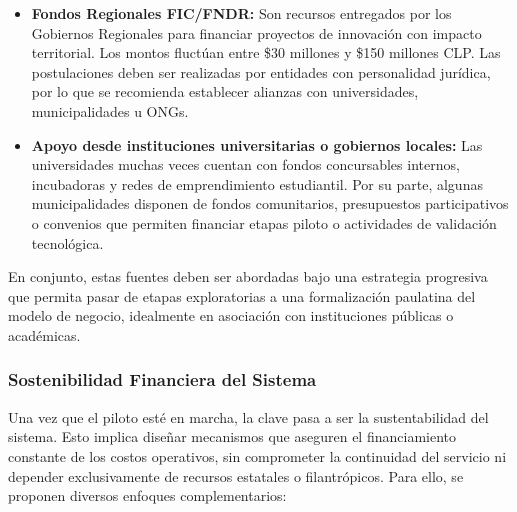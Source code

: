 \documentclass[12pt]{article}
\begin{document}
\begin{itemize}
    \item \textbf{Fondos Regionales FIC/FNDR:} Son recursos entregados por los Gobiernos Regionales para financiar proyectos de innovación con impacto territorial. Los montos fluctúan entre \$30 millones y \$150 millones CLP. Las postulaciones deben ser realizadas por entidades con personalidad jurídica, por lo que se recomienda establecer alianzas con universidades, municipalidades u ONGs.
    \item \textbf{Apoyo desde instituciones universitarias o gobiernos locales:} Las universidades muchas veces cuentan con fondos concursables internos, incubadoras y redes de emprendimiento estudiantil. Por su parte, algunas municipalidades disponen de fondos comunitarios, presupuestos participativos o convenios que permiten financiar etapas piloto o actividades de validación tecnológica.
\end{itemize}
En conjunto, estas fuentes deben ser abordadas bajo una estrategia progresiva que permita pasar de etapas exploratorias a una formalización paulatina del modelo de negocio, idealmente en asociación con instituciones públicas o académicas.\\

\newpage
\subsubsection{Sostenibilidad Financiera del Sistema}
Una vez que el piloto esté en marcha, la clave pasa a ser la sustentabilidad del sistema. Esto implica diseñar mecanismos que aseguren el financiamiento constante de los costos operativos, sin comprometer la continuidad del servicio ni depender exclusivamente de recursos estatales o filantrópicos. Para ello, se proponen diversos enfoques complementarios:
\end{document}
